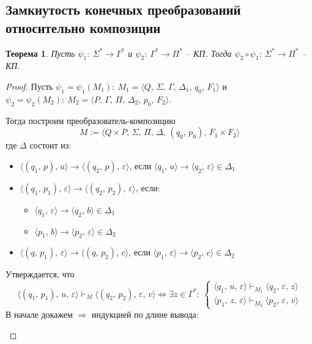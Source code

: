 \documentclass[a4paper,12pt]{article}
\theoremstyle{plain}
\newtheorem{theorem}{Теорема}[subsection]
\theoremstyle{definition}
\theoremstyle{remark}
\begin{document}
\subsection{Замкнутость конечных преобразований относительно композиции}
\begin{theorem}
	Пусть $\psi_1 :\: \Sigma^* \to \Gamma^*$ и $\psi_2 :\: \Gamma^* \to \Pi^*$ -- КП. Тогда $\psi_2\circ\psi_1 :\: \Sigma^* \to \Pi^*$ -- КП.
\end{theorem}

\begin{proof}
	Пусть $\psi_1 = \psi_1(M_1):\: M_1 = \langle Q,\,\Sigma,\,\Gamma,\,\Delta_1,\,q_0,\,F_1\rangle$ и $\psi_2 = \psi_2(M_2) :\: M_2 = \langle P,\, \Gamma,\, \Pi,\, \Delta_2,\, p_0,\, F_2\rangle$.

	Тогда построим преобразователь-композицию
	\[
		M := \langle Q\times P,\, \Sigma,\, \Pi,\, \Delta,\, (q_0,\, p_0),\, F_1\times F_2\rangle
	\]
	где $\Delta$ состоит из:
	\begin{itemize}
		\item $\langle(q_1,\,p),\,a\rangle\to\langle(q_2,\,p),\,\varepsilon\rangle$, если $\langle q_1,\,a\rangle \to \langle q_2,\,\varepsilon\rangle \in \Delta_1$
		\item $\langle(q_1,\,p_1),\,\varepsilon\rangle\to\langle(q_2,\,p_2),\,\varepsilon\rangle$, если:
		      \begin{itemize}
			      \item $\langle q_1,\,\varepsilon \rangle\to\langle q_2,\,b\rangle \in \Delta_1$
			      \item $\langle p_1,\,b\rangle\to\langle p_2,\,\varepsilon\rangle \in \Delta_2$
		      \end{itemize}
		\item $\langle(q,\,p_1),\,\varepsilon\rangle\to\langle(q,\,p_2),\,c\rangle$, если $\langle p_1,\,\varepsilon\rangle\to\langle p_2,\,c\rangle \in \Delta_2$
	\end{itemize}
	Утверждается, что
	\[
		\langle(q_1,\,p_1),\,u,\,\varepsilon\rangle\vdash_M\langle(q_2,\,p_2),\,\varepsilon,\,v\rangle\Leftrightarrow \exists z \in \Gamma^* :\: \begin{cases}
			\langle q_1,\,u,\,\varepsilon\rangle\vdash_{M_1}\langle q_2,\,\varepsilon,\,z\rangle \\
			\langle p_1,\,z,\,\varepsilon\rangle\vdash_{M_2}\langle p_2,\,\varepsilon,\, v\rangle
		\end{cases}
	\]
	В начале докажем $\Rightarrow$ индукцией по длине вывода:
	\begin{itemize}

\end{itemize}
\end{proof}
\end{document}
